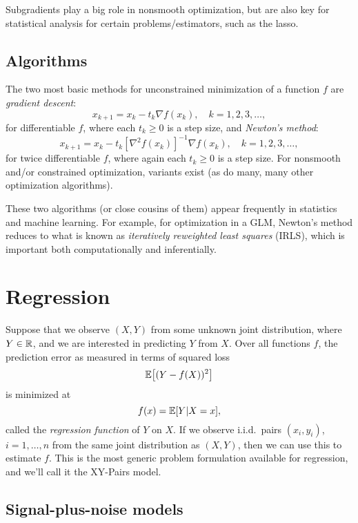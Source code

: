 \documentclass{article}
\begin{document}
Subgradients play a big role in nonsmooth optimization, but are also key for 
statistical analysis for certain problems/estimators, such as the lasso.

\subsection{Algorithms}

The two most basic methods for unconstrained minimization of a function $f$ are
\emph{gradient descent}:  
\[
x_{k+1} = x_k - t_k \nabla f(x_k), \quad k=1,2,3,\dots,
\]
for differentiable $f$, where each $t_k \geq 0$ is a step size, and
\emph{Newton's method}: 
\[
x_{k+1} = x_k - t_k [\nabla^2 f(x_k)]^{-1} \nabla f(x_k), \quad k=1,2,3,\dots, 
\]
for twice differentiable $f$, where again each $t_k \geq 0$ is a step size. For
nonsmooth and/or constrained optimization, variants exist (as do many, many
other optimization algorithms). 

These two algorithms (or close cousins of them) appear frequently in statistics
and machine learning. For example, for optimization in a GLM, Newton's method 
reduces to what is known as \emph{iteratively reweighted least squares} (IRLS), 
which is important both computationally and inferentially. 

\section{Regression}

Suppose that we observe $(X,Y)$ from some unknown joint distribution, where $Y
\in \mathbb{R}$, and we are interested in predicting $Y$ from $X$. Over all functions
$f$, the prediction error as measured in terms of squared loss        
\[
\mathbb{E}\big[ (Y - f(X))^2\big]
\]
is minimized at
\[
f(x) = \mathbb{E}[Y | X=x], 
\]  
called the \emph{regression function} of $Y$ on $X$. If we observe i.i.d.\ pairs 
$(x_i,y_i)$, $i=1,\dots,n$ from the same joint distribution as $(X,Y)$, then we
can use this to estimate $f$. This is the most generic problem formulation 
available for regression, and we'll call it the XY-Pairs model.  

\subsection{Signal-plus-noise models}
\end{document}
